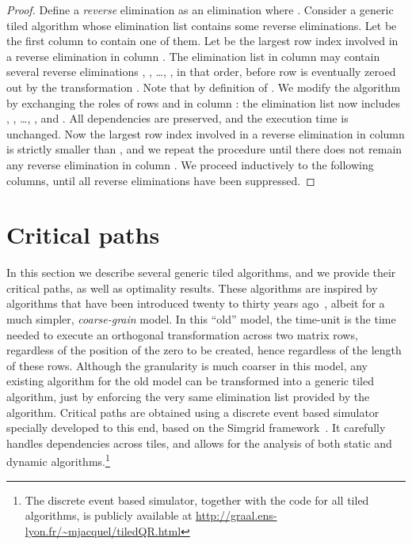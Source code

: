 \documentclass[a4paper,twopages]{article}
\newcommand{\TiledQRURL}{\url{http://graal.ens-lyon.fr/~mjacquel/tiledQR.html}\xspace}
\begin{document}
\begin{proof}
    Define a \emph{reverse} elimination as an elimination 
    where .  Consider a generic tiled algorithm whose
    elimination list contains some reverse eliminations. Let  be the first
    column to contain one of them. Let  be the largest row index involved in
    a reverse elimination in column .  The elimination list in column 
    may contain several reverse eliminations  , , \dots, , in that order, before row  is
    eventually zeroed out by the transformation  .
    Note that  by definition of .  We modify
    the algorithm by exchanging the roles of rows  and  in column :
    the elimination list now includes , , \dots, , and \newline
    . All
    dependencies are preserved, and the execution time is unchanged. Now the largest
    row index involved in a reverse elimination in column  is strictly smaller
    than , and we repeat the procedure until there does not remain any reverse
    elimination in column . We proceed inductively to the following columns,
    until all reverse eliminations have been suppressed.
\end{proof}


\section{Critical paths}
\label{sec.CP}

In this section we describe several generic tiled algorithms, and we provide
their critical paths, as well as optimality results. These algorithms are
inspired by algorithms that have been introduced twenty to thirty years
ago~\cite{SamehKuck78,ModiClarke84,j14,j12}, albeit for a much simpler,
\emph{coarse-grain} model.  In this ``old'' model, the time-unit is the time needed to
execute an orthogonal transformation across two matrix rows, regardless of the
position of the zero to be created, hence regardless of the length of these rows.
Although the granularity is much coarser in this model, any existing algorithm
for the old model can be transformed into a generic tiled algorithm, just by
enforcing the very same elimination list provided by the algorithm.
Critical paths are obtained using a discrete event based simulator specially developed
to this end, based on the Simgrid framework~\cite{simgrid}. It carefully
handles dependencies across tiles, and allows for the analysis of both static and dynamic
algorithms.\footnote{The discrete event based simulator, together with the code for all tiled algorithms,
is publicly available at \TiledQRURL}
\end{document}
